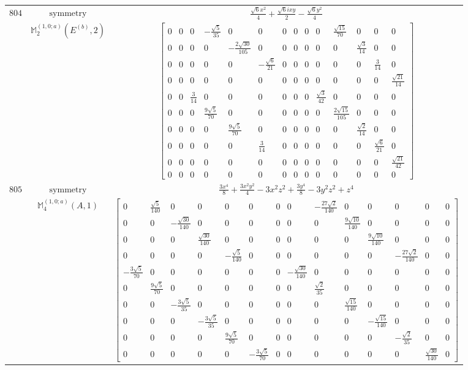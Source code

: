 \documentclass[fleqn,8pt,landscape]{jsarticle}
\begin{document}
\begin{longtable}{ccc}
$ 804 $ & $ \text{symmetry} $ & $ \frac{\sqrt{6} x^{2}}{4} + \frac{\sqrt{6} i x y}{2} - \frac{\sqrt{6} y^{2}}{4} $ \\
$  $ & $ \mathbb{M}_{2}^{(1,0;a)}(E^{(b)},2) $ & $ \begin{bmatrix} 0 & 0 & 0 & - \frac{\sqrt{5}}{35} & 0 & 0 & 0 & 0 & 0 & 0 & \frac{\sqrt{15}}{70} & 0 & 0 & 0 \\ 0 & 0 & 0 & 0 & - \frac{2 \sqrt{30}}{105} & 0 & 0 & 0 & 0 & 0 & 0 & \frac{\sqrt{3}}{14} & 0 & 0 \\ 0 & 0 & 0 & 0 & 0 & - \frac{\sqrt{6}}{21} & 0 & 0 & 0 & 0 & 0 & 0 & \frac{3}{14} & 0 \\ 0 & 0 & 0 & 0 & 0 & 0 & 0 & 0 & 0 & 0 & 0 & 0 & 0 & \frac{\sqrt{21}}{14} \\ 0 & 0 & \frac{3}{14} & 0 & 0 & 0 & 0 & 0 & 0 & \frac{\sqrt{3}}{42} & 0 & 0 & 0 & 0 \\ 0 & 0 & 0 & \frac{9 \sqrt{5}}{70} & 0 & 0 & 0 & 0 & 0 & 0 & \frac{2 \sqrt{15}}{105} & 0 & 0 & 0 \\ 0 & 0 & 0 & 0 & \frac{9 \sqrt{5}}{70} & 0 & 0 & 0 & 0 & 0 & 0 & \frac{\sqrt{2}}{14} & 0 & 0 \\ 0 & 0 & 0 & 0 & 0 & \frac{3}{14} & 0 & 0 & 0 & 0 & 0 & 0 & \frac{\sqrt{6}}{21} & 0 \\ 0 & 0 & 0 & 0 & 0 & 0 & 0 & 0 & 0 & 0 & 0 & 0 & 0 & \frac{\sqrt{21}}{42} \\ 0 & 0 & 0 & 0 & 0 & 0 & 0 & 0 & 0 & 0 & 0 & 0 & 0 & 0 \end{bmatrix} $ \\ \hline
$ 805 $ & $ \text{symmetry} $ & $ \frac{3 x^{4}}{8} + \frac{3 x^{2} y^{2}}{4} - 3 x^{2} z^{2} + \frac{3 y^{4}}{8} - 3 y^{2} z^{2} + z^{4} $ \\
$  $ & $ \mathbb{M}_{4}^{(1,0;a)}(A,1) $ & $ \begin{bmatrix} 0 & \frac{\sqrt{5}}{140} & 0 & 0 & 0 & 0 & 0 & 0 & - \frac{27 \sqrt{2}}{140} & 0 & 0 & 0 & 0 & 0 \\ 0 & 0 & - \frac{\sqrt{30}}{140} & 0 & 0 & 0 & 0 & 0 & 0 & \frac{9 \sqrt{10}}{140} & 0 & 0 & 0 & 0 \\ 0 & 0 & 0 & \frac{\sqrt{30}}{140} & 0 & 0 & 0 & 0 & 0 & 0 & \frac{9 \sqrt{10}}{140} & 0 & 0 & 0 \\ 0 & 0 & 0 & 0 & - \frac{\sqrt{5}}{140} & 0 & 0 & 0 & 0 & 0 & 0 & - \frac{27 \sqrt{2}}{140} & 0 & 0 \\ - \frac{3 \sqrt{5}}{70} & 0 & 0 & 0 & 0 & 0 & 0 & - \frac{\sqrt{30}}{140} & 0 & 0 & 0 & 0 & 0 & 0 \\ 0 & \frac{9 \sqrt{5}}{70} & 0 & 0 & 0 & 0 & 0 & 0 & \frac{\sqrt{2}}{35} & 0 & 0 & 0 & 0 & 0 \\ 0 & 0 & - \frac{3 \sqrt{5}}{35} & 0 & 0 & 0 & 0 & 0 & 0 & \frac{\sqrt{15}}{140} & 0 & 0 & 0 & 0 \\ 0 & 0 & 0 & - \frac{3 \sqrt{5}}{35} & 0 & 0 & 0 & 0 & 0 & 0 & - \frac{\sqrt{15}}{140} & 0 & 0 & 0 \\ 0 & 0 & 0 & 0 & \frac{9 \sqrt{5}}{70} & 0 & 0 & 0 & 0 & 0 & 0 & - \frac{\sqrt{2}}{35} & 0 & 0 \\ 0 & 0 & 0 & 0 & 0 & - \frac{3 \sqrt{5}}{70} & 0 & 0 & 0 & 0 & 0 & 0 & \frac{\sqrt{30}}{140} & 0 \end{bmatrix} $ \\ \hline

\end{longtable}
\end{document}
